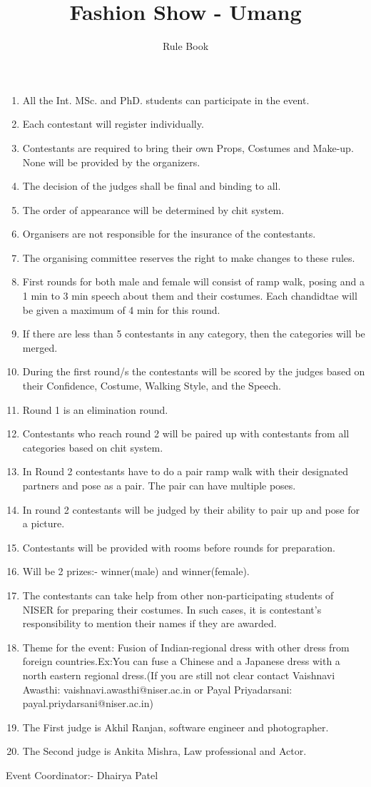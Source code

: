 \documentclass[a4paper, 11pt]{proc}
\begin{document}
\title{Fashion Show - Umang}
\author{Rule Book}
\maketitle
\begin{enumerate}
	\item All the Int. MSc. and PhD. students can participate in the event.
	\item Each contestant will register individually.
	\item Contestants are required to bring their own Props, Costumes and Make-up. None will be provided by the organizers.
	\item The decision of the judges shall be final and binding to all.
	\item The order of appearance will be determined by chit system.
	\item Organisers are not responsible for the insurance of the contestants.
	\item The organising committee reserves the right to make changes to these rules.
	\item First rounds for both male and female will consist of ramp walk, posing and a 1 min to 3 min speech about them and their costumes. Each chandidtae will be given a maximum of 4 min for this round.
	\item If there are less than 5 contestants in any category, then the categories will be merged.
	\item During the first round/s the contestants will be scored by the judges based on their Confidence, Costume, Walking Style, and the Speech.
	\item Round 1 is an elimination round.
	\item Contestants who reach round 2 will be paired up with contestants from all categories based on chit system.
	\item In Round 2 contestants have to do a pair ramp walk with their designated partners and pose as a pair. The pair can have multiple poses.
	\item In round 2 contestants will be judged by their ability to pair up and pose for a picture.
	\item Contestants will be provided with rooms before rounds for preparation.
	\item Will be 2 prizes:- winner(male) and winner(female).
	\item The contestants can take help from other non-participating students of NISER for preparing their costumes. In such cases, it is contestant's responsibility to mention their names if they are awarded.
	\item Theme for the event: Fusion of Indian-regional dress with other dress from foreign countries.Ex:You can fuse a Chinese and a Japanese dress with a north eastern regional dress.(If you are still not clear contact Vaishnavi Awasthi: vaishnavi.awasthi@niser.ac.in or Payal Priyadarsani: payal.priydarsani@niser.ac.in)
	\item The First judge is Akhil Ranjan, software engineer and photographer.
	\item The Second judge is Ankita Mishra, Law professional and Actor.
\end{enumerate}
Event Coordinator:- Dhairya Patel
\end{document}
